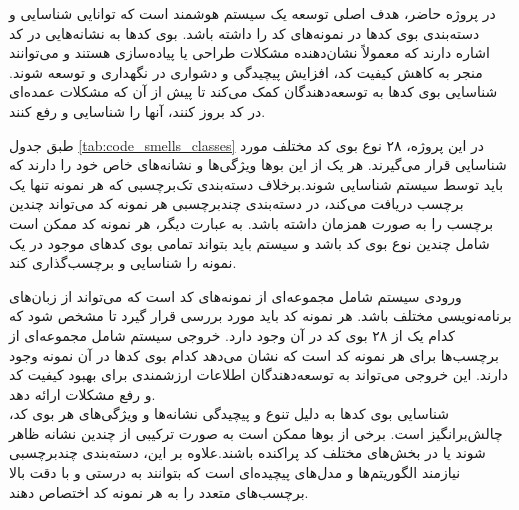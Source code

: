 در پروژه حاضر، هدف اصلی توسعه یک سیستم هوشمند است که توانایی شناسایی و دسته‌بندی بوی کدها در نمونه‌های کد را داشته باشد. بوی کدها به نشانه‌هایی در کد اشاره دارند که معمولاً نشان‌دهنده مشکلات طراحی یا پیاده‌سازی هستند و می‌توانند منجر به کاهش کیفیت کد، افزایش پیچیدگی و دشواری در نگهداری و توسعه شوند. شناسایی بوی کدها به توسعه‌دهندگان کمک می‌کند تا پیش از آن که مشکلات عمده‌ای در کد بروز کنند، آنها را شناسایی و رفع کنند.

طبق جدول \ref{tab:code_smells_classes}
در این پروژه، ۲۸ نوع بوی کد مختلف مورد شناسایی قرار می‌گیرند. هر یک از این بوها ویژگی‌ها و نشانه‌های خاص خود را دارند که باید توسط سیستم شناسایی شوند.برخلاف دسته‌بندی تک‌برچسبی که هر نمونه تنها یک برچسب دریافت می‌کند، در دسته‌بندی چندبرچسبی هر نمونه کد می‌تواند چندین برچسب را به صورت همزمان داشته باشد. به عبارت دیگر، هر نمونه کد ممکن است شامل چندین نوع بوی کد باشد و سیستم باید بتواند تمامی بوی کدهای موجود در یک نمونه را شناسایی و برچسب‌گذاری کند.
\clearpage


ورودی سیستم شامل مجموعه‌ای از نمونه‌های کد است که می‌تواند از زبان‌های برنامه‌نویسی مختلف باشد. هر نمونه کد باید مورد بررسی قرار گیرد تا مشخص شود که کدام یک از ۲۸ بوی کد در آن وجود دارد.
خروجی سیستم شامل مجموعه‌ای از برچسب‌ها برای هر نمونه کد است که نشان می‌دهد کدام بوی کدها در آن نمونه وجود دارند. این خروجی می‌تواند به توسعه‌دهندگان اطلاعات ارزشمندی برای بهبود کیفیت کد و رفع مشکلات ارائه دهد.
\\
شناسایی بوی کدها به دلیل تنوع و پیچیدگی نشانه‌ها و ویژگی‌های هر بوی کد، چالش‌برانگیز است. برخی از بوها ممکن است به صورت ترکیبی از چندین نشانه ظاهر شوند یا در بخش‌های مختلف کد پراکنده باشند.علاوه بر این، دسته‌بندی چندبرچسبی نیازمند الگوریتم‌ها و مدل‌های پیچیده‌ای است که بتوانند به درستی و با دقت بالا برچسب‌های متعدد را به هر نمونه کد اختصاص دهند.\cite{guggulothu2019codesmelldetectionusing}\cite{guggulothu2020code}
\clearpage